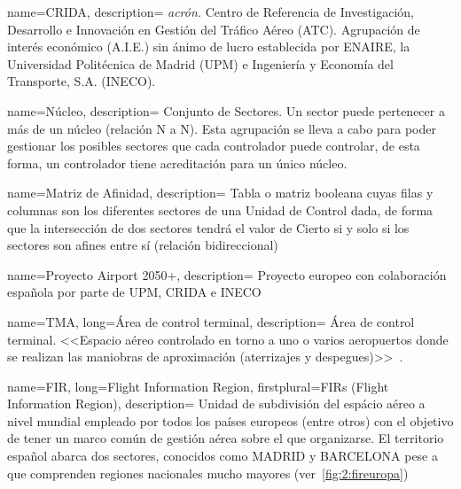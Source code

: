 {
    name={CRIDA},
    description=
    {   
        \textit{acrón.} Centro de Referencia de Investigación, Desarrollo e Innovación 
        en Gestión del Tráfico Aéreo (\gls{ATC}). Agrupación de interés económico (A.I.E.) sin ánimo de lucro 
        establecida por ENAIRE, la Universidad Politécnica de Madrid (UPM) e Ingeniería y Economía del Transporte, S.A. 
        (INECO).~\cite{CRIDA-web}
    }
}

{
    name={Núcleo},
    description=
    {   
        Conjunto de Sectores. Un sector puede pertenecer a más de un núcleo (relación N a N). Esta 
        agrupación se lleva a cabo para poder gestionar los posibles sectores que cada controlador puede controlar, de 
        esta 
        forma, un controlador tiene acreditación para un único núcleo.
    }
}

{
    name={Matriz de Afinidad},
    description=
    {   
        Tabla o matriz booleana cuyas filas y columnas son los diferentes sectores de 
        una Unidad de Control dada, de forma que la intersección de dos sectores tendrá el valor de Cierto si y solo si 
        los sectores son afines entre sí (relación bidireccional)
    }
}

{
    name={Proyecto Airport 2050+},
    description=
    {   
        Proyecto europeo con colaboración española por parte de UPM, CRIDA e INECO
    }
}

{
    name={TMA},
    long={Área de control terminal},
    description=
    {   
        Área de control terminal. <<Espacio aéreo controlado en torno a uno o varios aeropuertos 
        donde se realizan las maniobras de aproximación (aterrizajes y despegues)>>~\cite{ENAIRE-web}.
    }
}

{
    name={FIR},
    long={Flight Information Region},
    firstplural={FIRs (Flight Information Region)},
    description=
    {   
        Unidad de subdivisión del espácio aéreo a nivel mundial empleado por todos los países europeos (entre otros) 
        con el objetivo de tener un marco común de gestión aérea sobre el que organizarse. El territorio español abarca 
        dos sectores, conocidos como MADRID y BARCELONA pese a que comprenden regiones nacionales mucho mayores 
        (ver~\autoref{fig:2:fireuropa})
    }
}



